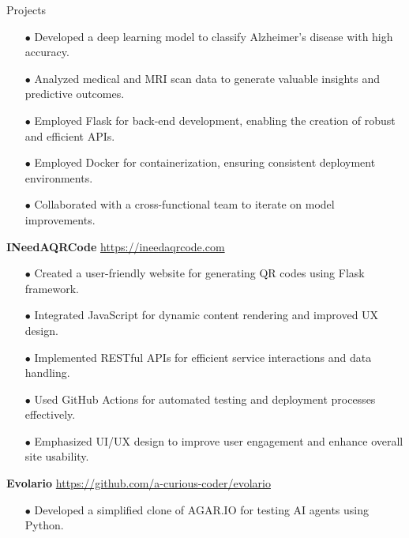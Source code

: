\begin{rSection}{Projects}
\begin{itemize}[label=\myfancylabel, leftmargin=0.5cm, topsep=-5pt, itemsep=-1ex]
\setlength\itemsep{-0.25cm}
    \item[$\bullet$] Developed a deep learning model to classify Alzheimer's disease with high accuracy.
    \item[$\bullet$] Analyzed medical and MRI scan data to generate valuable insights and predictive outcomes.
    \item[$\bullet$] Employed Flask for back-end development, enabling the creation of robust and efficient APIs.
    \item[$\bullet$] Employed Docker for containerization, ensuring consistent deployment environments.
    \item[$\bullet$] Collaborated with a cross-functional team to iterate on model improvements.
\end{itemize}
\vspace{0.12cm}
{\bf INeedAQRCode}
\hspace{2 cm}{Flask, Python, JavaScript}
\hfill{\href{https://ineedaqrcode.com}{https://ineedaqrcode.com}}
\begin{itemize}[label=\myfancylabel, leftmargin=0.5cm, topsep=-5pt, itemsep=-1ex]
\setlength\itemsep{-0.25cm}
    \item[$\bullet$] Created a user-friendly website for generating QR codes using Flask framework.
    \item[$\bullet$] Integrated JavaScript for dynamic content rendering and improved UX design.
    \item[$\bullet$] Implemented RESTful APIs for efficient service interactions and data handling.
    \item[$\bullet$] Used GitHub Actions for automated testing and deployment processes effectively.
    \item[$\bullet$] Emphasized UI/UX design to improve user engagement and enhance overall site usability.
\end{itemize}
\vspace{0.12cm}
{\bf Evolario}
\hspace{2 cm}{Python, AI, GitHub}
\hfill{\href{https://github.com/a-curious-coder/evolario}{https://github.com/a-curious-coder/evolario}}
\begin{itemize}[label=\myfancylabel, leftmargin=0.5cm, topsep=-5pt, itemsep=-1ex]
\setlength\itemsep{-0.25cm}
    \item[$\bullet$] Developed a simplified clone of AGAR.IO for testing AI agents using Python.

\end{itemize}
\end{rSection}
